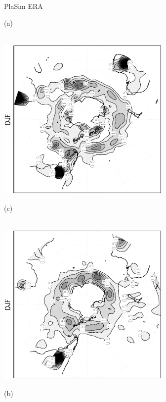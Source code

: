 \documentclass[12pt,a4paper,twoside,openright,headinclude,liststotoc,bibtotoc]{scrreprt}
\begin{document}
\begin{appendix}
\begin{figure}[b]
\hspace{3.8cm}PlaSim \vspace{0.2cm} \hspace{7.3cm} ERA \\
\parbox{8.5cm}{\hspace{0.95cm}\begin{scriptsize}(a)\end{scriptsize} \vspace{-0.5cm} \\
\includegraphics[height=8.0cm,angle=-90]
{eps/cyclgen_PLASIM_T21_45DJF_SH.eps}
}
\parbox{8.5cm}{\hspace{0.95cm}\begin{scriptsize}(c)\end{scriptsize} \vspace{-0.5cm} \\
\includegraphics[height=8.0cm,angle=-90]
{eps/cyclgen_ERA40_T21_45DJF_SH.eps}
}
\parbox{8.5cm}{\hspace{0.95cm}\begin{scriptsize}(b)\end{scriptsize} \vspace{-0.5cm} \\
}
\end{figure}
\end{appendix}
\end{document}
